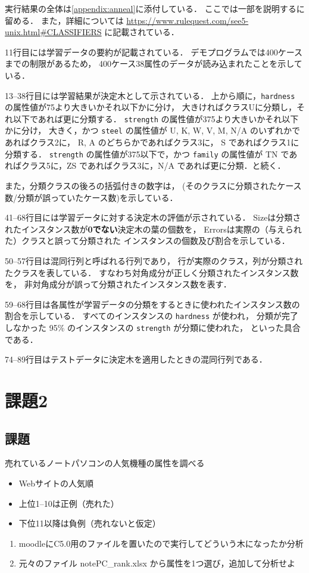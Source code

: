 \documentclass[a4paper, lualatex, ja=standard]{bxjsarticle}
\begin{document}
実行結果の全体は\ref{appendix:anneal}に添付している．
ここでは一部を説明するに留める．
また，詳細については
\url{https://www.rulequest.com/see5-unix.html#CLASSIFIERS} に記載されている．

11行目には学習データの要約が記載されている．
デモプログラムでは400ケースまでの制限があるため，
400ケース38属性のデータが読み込まれたことを示している．

13--38行目には学習結果が決定木として示されている．
上から順に，\verb|hardness| の属性値が75より大きいかそれ以下かに分け，
大きければクラスUに分類し，それ以下であれば更に分類する．
\verb|strength| の属性値が375より大きいかそれ以下かに分け，
大きく，かつ \verb|steel| の属性値が
U, K, W, V, M, N/A のいずれかであればクラス2に，
R, A のどちらかであればクラス3に，
S であればクラス1に分類する．
\verb|strength| の属性値が375以下で，かつ \verb|family| の属性値が
TN であればクラス5に，ZS であればクラス3に，N/A であれば更に分類．と続く．

また，分類クラスの後ろの括弧付きの数字は，
(そのクラスに分類されたケース数/分類が誤っていたケース数)を示している．

41--68行目には学習データに対する決定木の評価が示されている．
Sizeは分類されたインスタンス数が\textbf{0でない}決定木の葉の個数を，
Errorsは実際の（与えられた）クラスと誤って分類された
インスタンスの個数及び割合を示している．

50--57行目は混同行列と呼ばれる行列であり，
行が実際のクラス，列が分類されたクラスを表している．
すなわち対角成分が正しく分類されたインスタンス数を，
非対角成分が誤って分類されたインスタンス数を表す．

59--68行目は各属性が学習データの分類をするときに使われたインスタンス数の割合を示している．
すべてのインスタンスの \verb|hardness| が使われ，
分類が完了しなかった 95\% のインスタンスの \verb|strength| が分類に使われた，
といった具合である．

74--89行目はテストデータに決定木を適用したときの混同行列である．


\section{課題2}

\subsection{課題}

売れているノートパソコンの人気機種の属性を調べる
\begin{itemize}
\item Webサイトの人気順
\item 上位1--10は正例（売れた）
\item 下位11以降は負例（売れないと仮定）
\end{itemize}
\begin{enumerate}
\item moodleにC5.0⽤のファイルを置いたので実行してどういう木になったか分析
\item 元々のファイル notePC\_rank.xlsx から属性を1つ選び，追加して分析せよ
\end{enumerate}
\end{document}
